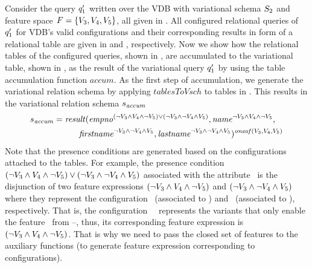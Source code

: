 

\begin{example}
\label{eg:acc-table-from-conf}
Consider the query $\VVal {\vQ_1}$ written over the VDB with variational schema $\vSch_2$ and 
feature space $\features = \setDef {\vThree, \vFour, \vFive}$, all given in . 
%
All configured relational queries of $\VVal {\vQ_1}$ for VDB's valid configurations and their
corresponding results in form of a relational table are given
in  and , respectively. 
%
Now we show how the relational tables of the configured queries, shown in , are accumulated 
to the variational table, shown in , as the result of the variational query $\VVal \vQ_1$ by 
using the table accumulation function $\mathit{accum}$.
%
As the first step of accumulation, we generate the variational relation schema by
applying $\mathit{tablesToVsch}$ to tables in . 
This results in the variational relation schema $\vRelSch_{\mathit{accum}}$
%
\begin{alignat*}{1}
\vRelSch_{\mathit{accum}} &= \mathit{result} (\annot [(\neg \vThree \wedge \vFour \wedge \neg \vFive)\vee(\neg \vThree \wedge \neg \vFour \wedge \vFive)] \empno, \annot [\neg \vThree \wedge \vFour \wedge \neg \vFive] \name,\\
&\hspace{30pt}\annot [\neg \vThree \wedge \neg \vFour \wedge \vFive] \fname, \annot [\neg \vThree \wedge \neg \vFour \wedge \vFive] \lname)^{\oneof {\vThree,\vFour,\vFive}}
\end{alignat*}
%
\noindent
Note that the presence conditions are generated based on the configurations attached to
the tables. For example, the presence condition $(\neg \vThree \wedge \vFour \wedge \neg \vFive)\vee(\neg \vThree \wedge \neg \vFour \wedge \vFive)$ associated with the attribute \empno\
is the disjunction of  two feature expressions $(\neg \vThree \wedge \vFour \wedge \neg \vFive)$
and $(\neg \vThree \wedge \neg \vFour \wedge \vFive)$ where they represent the configuration
\setDef \vFour\ (associated to \tabref{vq-conf2}) and \setDef \vFive\ (associated to ),
respectively. That is, the configuration \setDef\ \vFour\ represents the variants that only enable the
feature \vFour\ from \vThree--\vFive, thus, its corresponding feature expression is $(\neg \vThree \wedge \vFour \wedge \neg \vFive)$. That is why we need to pass the closed set of features 
to the auxiliary functions (to generate feature expression corresponding to configurations).


\end{example}

